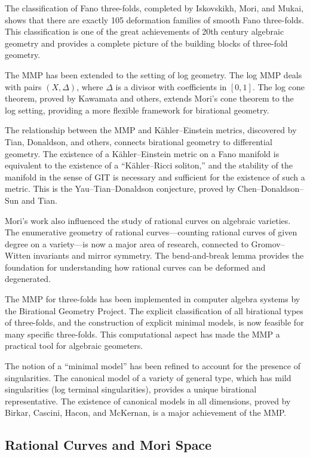 The classification of Fano three-folds, completed by Iskovskikh, Mori, and
Mukai, shows that there are exactly 105 deformation families of smooth Fano
three-folds. This classification is one of the great achievements of 20th
century algebraic geometry and provides a complete picture of the building
blocks of three-fold geometry.

The MMP has been extended to the setting of log geometry. The log MMP deals
with pairs $(X, \Delta)$, where $\Delta$ is a divisor with coefficients in $[0,1]$.
The log cone theorem, proved by Kawamata and others, extends Mori's cone theorem
to the log setting, providing a more flexible framework for birational geometry.

The relationship between the MMP and K\"ahler--Einstein metrics, discovered by
Tian, Donaldson, and others, connects birational geometry to differential
geometry. The existence of a K\"ahler--Einstein metric on a Fano manifold is
equivalent to the existence of a ``K\"ahler--Ricci soliton,'' and the stability
of the manifold in the sense of GIT is necessary and sufficient for the
existence of such a metric. This is the Yau--Tian--Donaldson conjecture, proved
by Chen--Donaldson--Sun and Tian.

Mori's work also influenced the study of rational curves on algebraic varieties.
The enumerative geometry of rational curves---counting rational curves of given
degree on a variety---is now a major area of research, connected to
Gromov--Witten invariants and mirror symmetry. The bend-and-break lemma
provides the foundation for understanding how rational curves can be deformed
and degenerated.

The MMP for three-folds has been implemented in computer algebra systems by
the Birational Geometry Project. The explicit classification of all birational
types of three-folds, and the construction of explicit minimal models, is now
feasible for many specific three-folds. This computational aspect has made the
MMP a practical tool for algebraic geometers.

The notion of a ``minimal model'' has been refined to account for the presence
of singularities. The canonical model of a variety of general type, which has
mild singularities (log terminal singularities), provides a unique birational
representative. The existence of canonical models in all dimensions, proved by
Birkar, Cascini, Hacon, and McKernan, is a major achievement of the MMP.

\subsection*{Rational Curves and Mori Space}

